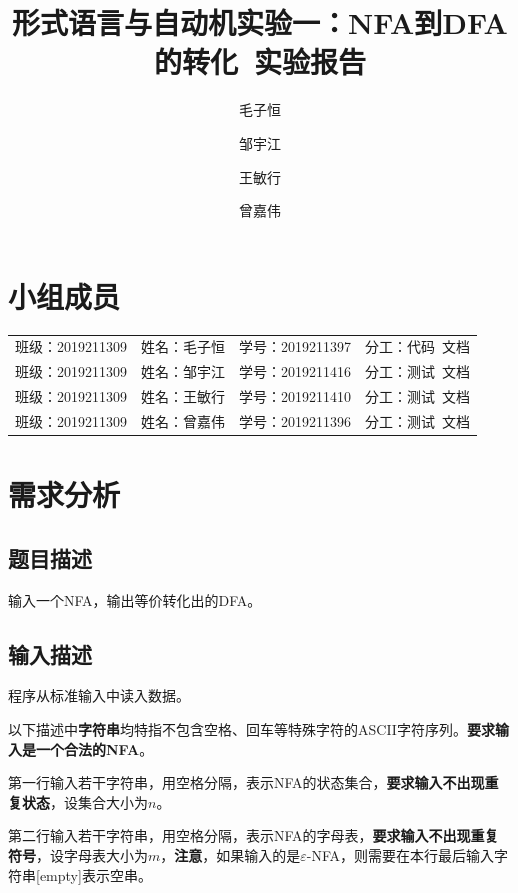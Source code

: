 \documentclass[lang=cn,11pt,a4paper,cite=authornum]{paper}
\title{形式语言与自动机实验一：NFA到DFA的转化\ 实验报告}
\author{毛子恒 \and 邹宇江 \and 王敏行 \and 曾嘉伟}
\institute{北京邮电大学\ 计算机学院}
\date{\zhtoday}
\begin{document}
\maketitle

\section*{小组成员}

\setlength{\tabcolsep}{7mm}
{
    \begin{table}[htbp]
        \centering
        \begin{tabular}{llll}
            班级：2019211309 & 姓名：毛子恒 & 学号：2019211397 & 分工：代码\ 文档 \\

            班级：2019211309 & 姓名：邹宇江 & 学号：2019211416 & 分工：测试\ 文档 \\

            班级：2019211309 & 姓名：王敏行 & 学号：2019211410 & 分工：测试\ 文档 \\

            班级：2019211309 & 姓名：曾嘉伟 & 学号：2019211396 & 分工：测试\ 文档 \\
        \end{tabular}
    \end{table}
}

\tableofcontents
\newpage

\section{需求分析}

\subsection{题目描述}

输入一个NFA，输出等价转化出的DFA。

\subsection{输入描述}

程序从标准输入中读入数据。

以下描述中\textbf{字符串}均特指不包含空格、回车等特殊字符的ASCII字符序列。\textbf{要求输入是一个合法的NFA}。

第一行输入若干字符串，用空格分隔，表示NFA的状态集合，\textbf{要求输入不出现重复状态}，设集合大小为$n$。

第二行输入若干字符串，用空格分隔，表示NFA的字母表，\textbf{要求输入不出现重复符号}，设字母表大小为$m$，\textbf{注意}，如果输入的是$\varepsilon$-NFA，则需要在本行最后输入字符串[empty]表示空串。
\end{document}
